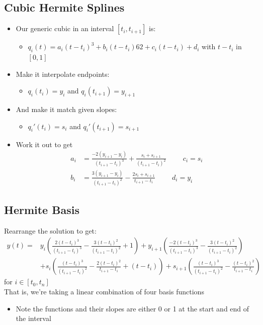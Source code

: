 \documentclass{article}
\begin{document}
\subsection*{Cubic Hermite Splines}
\begin{itemize}
    \item Our generic cubic in an interval $[t_i, t_{i + 1}]$ is:
    \begin{itemize}
        \item $q_i(t) = a_i(t - t_i)^3 + b_i (t - t_i)62 + c_i (t - t_i) + d_i$ with $t - t_i$ in $[0, 1]$
    \end{itemize}
    \item Make it interpolate endpoints:
    \begin{itemize}
        \item $q_i(t_i) = y_i$ and $q_i(t_{i + 1}) = y_{i + 1}$
    \end{itemize}
    \item And make it match given slopes:
    \begin{itemize}
        \item $q_i'(t_i) = s_i$ and $q_i'(t_{i + 1}) = s_{i + 1}$
    \end{itemize}
    \item Work it out to get
    \begin{align*}
        a_i &= \frac{-2(y_{i + 1} - y_i)}{(t_{i + 1} - t_i)^3} + \frac{s_i + s_{i + 1}}{(t_{i + 1} - t_i)^2} \hspace{1cm} c_i = s_i\\
        b_i &= \frac{3(y_{i + 1} - y_i)}{(t_{i + 1} - t_i)^2} - \frac{2s_i + s_{i + 1}}{t_{i + 1} - t_i} \hspace{1cm} d_i = y_i
    \end{align*}
\end{itemize}
\subsection*{Hermite Basis}
Rearrange the solution to get:
\begin{align*}
    y(t) = &y_i\left(\frac{2(t - t_i)^3}{(t_{i + 1} - t_i)^3} - \frac{3(t - t_i)^2}{(t_{i + 1} - t_i)^2} + 1 \right) + y_{i + 1}\left(\frac{-2(t - t_i)^3}{(t_{i + 1} - t_i)^3} - \frac{3(t - t_i)^2}{(t_{i + 1} - t_i)^2}\right) \\
    &+ s_i \left(\frac{(t - t_i)^3}{(t_{i + 1} - t_i)^2} - \frac{2(t - t_i)^2}{t_{i + 1} - t_i} + (t - t_i)\right) + s_{i + 1} \left(\frac{(t - t_i)^3}{(t_{i + 1} - t_i)^2} - \frac{(t - t_i)^2}{t_{i + 1} - t_i}\right)
\end{align*}
for $i \in [t_0, t_n]$\\
That is, we're taking a linear combination of four basis functions
\begin{itemize}
    \item Note the functions and their slopes are either 0 or 1 at the start and end of the interval
\end{itemize}
\end{document}
